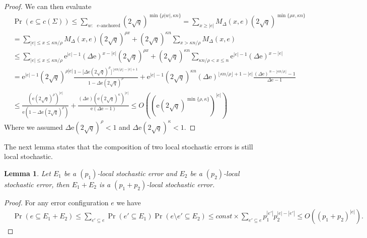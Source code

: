 \documentclass[twoside,english,aps,showpacs,pra,superscriptaddress]{revtex4-2}
\newcommand{\e}{\mathrm{e}}
\newtheorem{lemma}{Lemma}
\begin{document}
\begin{proof}
    We can then evaluate
    \begin{equation}
    \begin{aligned}
        &\Pr(e \subseteq c(\Sigma)) \leq \sum_{w: \text{ $e$-anchored}} (2\sqrt{q})^{\min\{\rho|w|, \kappa n\}} = \sum_{x \geq |e|} M_\Delta (x,e) (2\sqrt{q})^{\min\{\rho x, \kappa n\}}\\
        & =\sum_{|e| \leq x \leq \kappa n/\rho} M_\Delta (x,e) (2\sqrt{q})^{\rho x} + (2\sqrt{q})^{\kappa n} \sum_{x > \kappa n/\rho} M_\Delta (x,e) \\
        & \leq \sum_{|e| \leq x \leq \kappa n/\rho} \e^{|e|-1}(\Delta \e)^{x - |e|} (2\sqrt{q})^{\rho x} + (2\sqrt{q})^{\kappa n}\sum_{ \kappa n/\rho <x \leq n} \e^{|e|-1}(\Delta \e)^{x - |e|}\\
        &=\e^{|e|-1}(2\sqrt q)^{\rho |e|}
        \frac{1-\big[\Delta \e(2\sqrt q)^\rho\big]^{\,\lfloor \kappa n/\rho\rfloor-|e|+1}}
        {1-\Delta \e(2\sqrt q)^\rho}+\e^{|e|-1}(2\sqrt q)^{\kappa n}
        (\Delta \e)^{\lfloor \kappa n/\rho\rfloor+1-|e|}
        \frac{(\Delta \e)^{\,n-\lfloor \kappa n/\rho\rfloor}-1}{\Delta \e-1}\\
        & \leq
        \frac{ (\e (2\sqrt q)^{\rho})^{|e|}}
        {\e(1-\Delta \e(2\sqrt q)^\rho)}+
        \frac{(\Delta \e) (\e (2\sqrt q)^\kappa)^{|e|}}{\e(\Delta \e-1)} \leq O\left( \left(\e (2\sqrt q)^{\min\{\rho, \kappa\} } \right)^{|e|}\right)
    \end{aligned}
    \end{equation}
    Where we assumed $\Delta \e(2\sqrt q)^\rho < 1$ and $\Delta \e(2\sqrt q)^\kappa < 1$.
\end{proof}


The next lemma states that the composition of two local stochastic errors is still local stochastic.
    \begin{lemma}
        Let $E_1$ be a $(p_1)$-local stochastic error and $E_2$ be a $(p_2)$-local stochastic error, then $E_1+E_2$ is a $(p_1 + p_2)$-local stochastic error.
    \end{lemma}
    \begin{proof}
        For any error configuration $e$ we have
        \begin{equation}
        \begin{aligned}
            &\Pr(e \subseteq E_1 + E_2) \leq \sum_{e' \subseteq e} \Pr(e' \subseteq E_1) \Pr(e\setminus e' \subseteq E_2 )\leq const \times \sum_{e' \subseteq e} p_1^{|e'|} p_2^{|e|-|e'|} \leq O\left((p_1 +p_2)^{|e|} \right). 
        \end{aligned}
        \end{equation}
    \end{proof}
\end{document}
